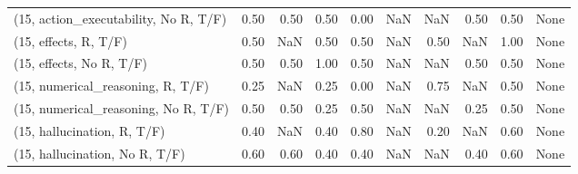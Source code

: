 \begin{table*}[h!]
\begin{adjustbox}{width=2\columnwidth,center}
\begin{tabular}{lrrr|rrr|rrr}
(15, action\_executability, No R, T/F) &                      0.50 &                  0.50 &                      0.50 &                          0.00 &                       NaN &                           NaN &                                   0.50 &                               0.50 &                                  None \\
(15, effects, R, T/F)                 &                      0.50 &                   NaN &                      0.50 &                          0.50 &                       NaN &                          0.50 &                                    NaN &                               1.00 &                                  None \\
(15, effects, No R, T/F)              &                      0.50 &                  0.50 &                      1.00 &                          0.50 &                       NaN &                           NaN &                                   0.50 &                               0.50 &                                  None \\
(15, numerical\_reasoning, R, T/F)     &                      0.25 &                   NaN &                      0.25 &                          0.00 &                       NaN &                          0.75 &                                    NaN &                               0.50 &                                  None \\
(15, numerical\_reasoning, No R, T/F)  &                      0.50 &                  0.50 &                      0.25 &                          0.50 &                       NaN &                           NaN &                                   0.25 &                               0.50 &                                  None \\
(15, hallucination, R, T/F)           &                      0.40 &                   NaN &                      0.40 &                          0.80 &                       NaN &                          0.20 &                                    NaN &                               0.60 &                                  None \\
(15, hallucination, No R, T/F)        &                      0.60 &                  0.60 &                      0.40 &                          0.40 &                       NaN &                           NaN &                                   0.40 &                               0.60 &                                  None \\

\end{tabular}
\end{adjustbox}
\end{table*}
